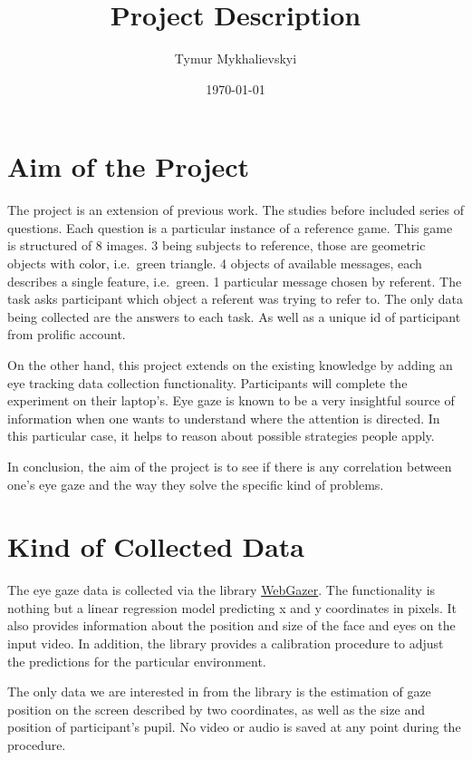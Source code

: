 \documentclass[11pt,a4paper]{article}
\title{Project Description}
\author{Tymur Mykhalievskyi}
\date{\today}
\begin{document}
\maketitle

\section{Aim of the Project}
The project is an extension of previous work. The studies before included series of questions. Each question is a particular instance of a reference game. This game is structured of 8 images. 3 being  subjects to reference, those are geometric objects with color, i.e.\ green triangle. 4 objects of available messages, each describes a single feature, i.e.\ green. 1 particular message chosen by referent. The task asks participant which object a referent was trying to refer to. The only data being collected are the answers to each task. As well as a unique id of participant from prolific account.

On the other hand, this project extends on the existing knowledge by adding an eye tracking data collection functionality. Participants will complete the experiment on their laptop's. Eye gaze is known to be a very insightful source of information when one wants to understand where the attention is directed. In this particular case, it helps to reason about possible strategies people apply. 

In conclusion, the aim of the project is to see if there is any correlation between one's eye gaze and the way they solve the specific kind of problems.

\section{Kind of Collected Data}
The eye gaze data is collected via the library \href{https://webgazer.cs.brown.edu/}{WebGazer}. The functionality is nothing but a linear regression model predicting x and y coordinates in pixels. It also provides information about the position and size of the face and eyes on the input video. In addition, the library provides a calibration procedure to adjust the predictions for the particular environment. 

The only data we are interested in from the library is the estimation of gaze position on the screen described by two coordinates, as well as the size  and position of participant's pupil. No video or audio is saved at any point during the procedure.
\end{document}
